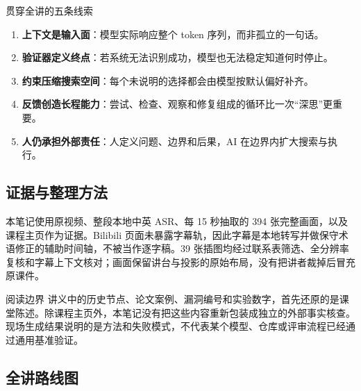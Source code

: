 \documentclass[a4paper,11pt]{article}
\begin{document}
\begin{knowledgebox}{贯穿全讲的五条线索}
\begin{enumerate}[leftmargin=2.2em]
  \item \textbf{上下文是输入面}：模型实际响应整个 token 序列，而非孤立的一句话。
  \item \textbf{验证器定义终点}：若系统无法识别成功，模型也无法稳定知道何时停止。
  \item \textbf{约束压缩搜索空间}：每个未说明的选择都会由模型按默认偏好补齐。
  \item \textbf{反馈创造长程能力}：尝试、检查、观察和修复组成的循环比一次“深思”更重要。
  \item \textbf{人仍承担外部责任}：人定义问题、边界和后果，AI 在边界内扩大搜索与执行。
\end{enumerate}
\end{knowledgebox}

\subsection{证据与整理方法}

本笔记使用原视频、整段本地中英 ASR、每 15 秒抽取的 394 张完整画面，以及课程主页作为证据。Bilibili 页面未暴露字幕轨，因此字幕是本地转写并做保守术语修正的辅助时间轴，不被当作逐字稿。39 张插图均经过联系表筛选、全分辨率复核和字幕上下文核对；画面保留讲台与投影的原始布局，没有把讲者裁掉后冒充原课件。

\begin{boundarybox}{阅读边界}
讲义中的历史节点、论文案例、漏洞编号和实验数字，首先还原的是课堂陈述。除课程主页外，本笔记没有把这些内容重新包装成独立的外部事实核查。现场生成结果说明的是方法和失败模式，不代表某个模型、仓库或评审流程已经通过通用基准验证。
\end{boundarybox}

\subsection{全讲路线图}
\end{document}
